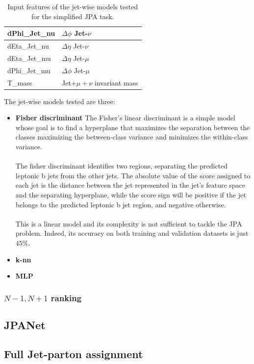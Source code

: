 \begin{minipage}{\linewidth}
\begin{minipage}{0.55\linewidth}
\begin{table}[H]
\begin{tabular}{l|l}
dPhi\_Jet\_nu & $\Delta \phi$ Jet-$\nu$\\
\midrule
dEta\_Jet\_nu & $\Delta \eta$ Jet-$\nu$\\
\midrule
dEta\_Jet\_mu & $\Delta \eta$ Jet-$\mu$\\
\midrule
dPhi\_Jet\_mu & $\Delta \phi$ Jet-$\mu$ \\
\midrule
T\_mass &  Jet$+\mu+\nu$ invariant mass\\
\bottomrule
\end{tabular}
\caption{Input features of the jet-wise models tested for the simplified JPA task.\\}
\label{tab:jet_inputs}
\end{table}
\end{minipage} 
\end{minipage}

The jet-wise models tested are three: 
\begin{itemize}
    \item \textbf{Fisher discriminant} The Fisher's linear discriminant \ADDREF is a simple model whose goal is to find a hyperplane that maximizes the separation between the classes maximizing the between-class variance and minimizes the within-class variance.\\
    \\
    The fisher discriminant identifies two regions, separating the predicted leptonic b jets from the other jets. The absolute value of the score assigned to each jet is the distance between the jet represented in the jet's feature space and the separating hyperplane, while the score sign will be positive if the jet belongs to the predicted leptonic b jet region, and negative otherwise.
    \\
    \\
    This is a linear model and its complexity is not sufficient to tackle the JPA problem. Indeed, its accuracy on both training and validation datasets is just $45\%$.
    \item \textbf{k-nn}
    \item \textbf{MLP}
\end{itemize}



\subsubsection*{{$N-1,N+1$} ranking}
\subsection{JPANet}
\subsection{Full Jet-parton assignment}

